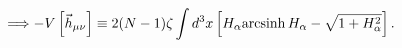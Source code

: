 \begin{equation}
\label{Vh}
\Longrightarrow -V\left[\vec h_{\mu\nu}\right]\equiv2(N-1)\zeta\int d^3x \left[H_\alpha{\rm arcsinh}{\,} H_\alpha
-\sqrt{1+H_\alpha^2}\right].
\end{equation}

